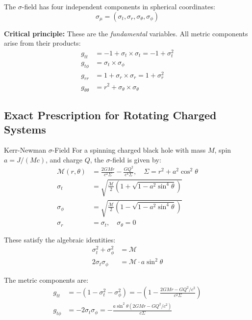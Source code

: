 \documentclass[11pt,a4paper]{article}
\theoremstyle{definition}
\theoremstyle{remark}
\begin{document}
	The $\sigma$-field has four independent components in spherical coordinates:
	\begin{equation}
		\boxed{\sigma_\mu = (\sigma_t, \sigma_r, \sigma_\theta, \sigma_\phi)}
	\end{equation}
	
	\textbf{Critical principle:} These are the \emph{fundamental} variables. All metric components arise from their products:
	\begin{align}
		g_{tt} &= -1 + \sigma_t \times \sigma_t = -1 + \sigma_t^2\\
		g_{t\phi} &= \sigma_t \times \sigma_\phi\\
		g_{rr} &= 1 + \sigma_r \times \sigma_r = 1 + \sigma_r^2\\
		g_{\theta\theta} &= r^2 + \sigma_\theta \times \sigma_\theta
	\end{align}
	
	\subsection{Exact Prescription for Rotating Charged Systems}
	
	Kerr-Newman $\sigma$-Field
		For a spinning charged black hole with mass $M$, spin $a = J/(Mc)$, and charge $Q$, the $\sigma$-field is given by:
		\begin{align}
			\mathcal{M}(r,\theta) &= \frac{2GMr}{c^2\Sigma} - \frac{GQ^2}{c^4\Sigma}, \quad \Sigma = r^2 + a^2\cos^2\theta\\
			\sigma_t &= \sqrt{\frac{\mathcal{M}}{2}\left(1 + \sqrt{1 - a^2\sin^4\theta}\right)}\\
			\sigma_\phi &= \sqrt{\frac{\mathcal{M}}{2}\left(1 - \sqrt{1 - a^2\sin^4\theta}\right)}\\
			\sigma_r &= \sigma_t, \quad \sigma_\theta = 0
		\end{align}
		
		These satisfy the algebraic identities:
		\begin{align}
			\sigma_t^2 + \sigma_\phi^2 &= \mathcal{M}\\
			2\sigma_t\sigma_\phi &= \mathcal{M} \cdot a\sin^2\theta
		\end{align}
		
		The metric components are:
		\begin{align}
			g_{tt} &= -(1 - \sigma_t^2 - \sigma_\phi^2) = -\left(1 - \frac{2GMr - GQ^2/c^2}{c^2\Sigma}\right)\\
			g_{t\phi} &= -2\sigma_t\sigma_\phi = -\frac{a\sin^2\theta(2GMr - GQ^2/c^2)}{c\Sigma}
		\end{align}
	
\end{document}

